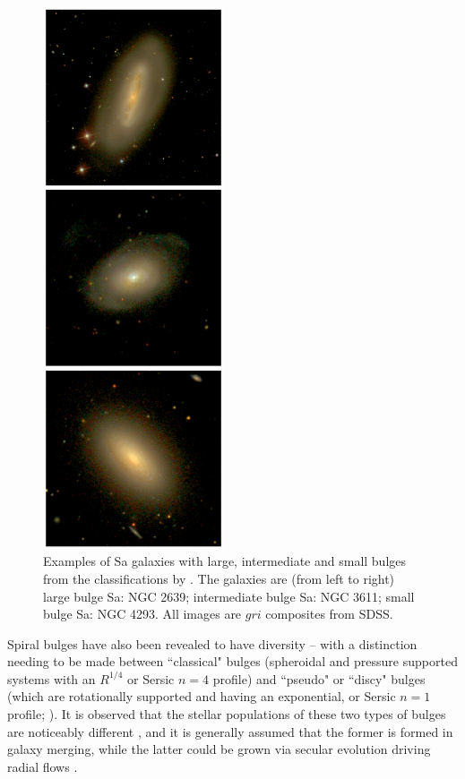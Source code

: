 \documentclass[usenatbib]{mn2e}
\begin{document}
\begin{figure}
\includegraphics[height=160mm,angle=90]{Figure2.ps}
\caption{Examples of Sa galaxies with large, intermediate and small bulges from the classifications by \citet{Hogg1993}.  The galaxies are (from left to right) large bulge Sa: NGC 2639; intermediate bulge Sa: NGC 3611; small bulge Sa: NGC 4293. All images are $gri$ composites from SDSS. \label{Sa}}
\end{figure}

Spiral bulges have also been revealed to have diversity -- with a distinction needing to be made between ``classical" bulges (spheroidal and pressure supported systems with an $R^{1/4}$ or Sersic $n=4$ profile) and ``pseudo" or ``discy" bulges (which are rotationally supported and having an exponential, or Sersic $n=1$ profile; \citealt{gadotti2009,kormendykennicutt2004}). It is observed that the stellar populations of these two types of bulges are noticeably different \citep{FisherDrory}, and it is generally assumed that the former is formed in galaxy merging, while the latter could be grown via secular evolution driving radial flows \citep[e.g.][]{gadotti2009}. 
\end{document}
